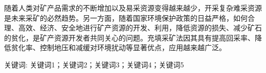 

\song\xiaosi 随着人类对矿产品需求的不断增加以及易采资源变得越来越少，开采复杂难采资源是未来采矿的必然趋势。另一方面，随着国家环境保护政策的日益严格，如何合理、高效、经济、安全地进行矿产资源的开发、利用，降低资源的损失、减少矿石的贫化，是矿产资源开发者共同关心的问题。充填采矿法因其具有提高回采率、降低贫化率、控制地压和减缓对环境扰动等显著优点，应用越来越广泛。

\vspace{\baselineskip}
\noindent \xiaosi\hei 关键词: \song\xiaosi 关键词1；关键词2；关键词3；关键词4；关键词5